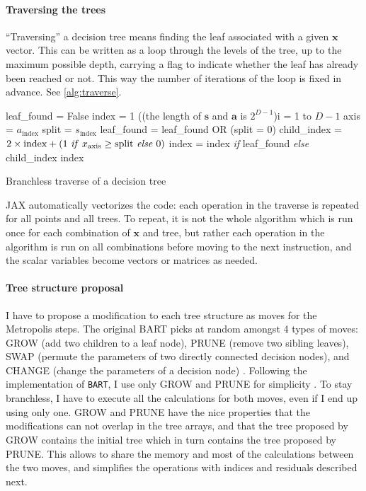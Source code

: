 \documentclass{article}
\begin{document}
    \paragraph{Traversing the trees}

    ``Traversing'' a decision tree means finding the leaf associated with a given $\mathbf x$ vector. This can be written as a loop through the levels of the tree, up to the maximum possible depth, carrying a flag to indicate whether the leaf has already been reached or not. This way the number of iterations of the loop is fixed in advance. See \autoref{alg:traverse}.
    \begin{algorithm}[t]
        leaf\_found = False\;
        index = 1\;
        \For(\hfill (the length of $\mathbf s$ and $\mathbf a$ is $2^{D-1}$\text{)}){i = 1 to $D - 1$}{
            axis = $a_\text{index}$\;
            split = $s_\text{index}$\;
            leaf\_found = leaf\_found OR (split = 0)\;
            child\_index = $2 \times \text{index} + (\text{1 \emph{if} $x_\text{axis} \ge \text{split}$ \emph{else} 0})$\;
            index = index \emph{if} leaf\_found \emph{else} child\_index\; 
        }
        \Return index
        \caption{\label{alg:traverse} Branchless traverse of a decision tree}
    \end{algorithm}
    JAX automatically vectorizes the code: each operation in the traverse is repeated for all points and all trees. To repeat, it is not the whole algorithm which is run once for each combination of $\mathbf x$ and tree, but rather each operation in the algorithm is run on all combinations before moving to the next instruction, and the scalar variables become vectors or matrices as needed.

    \paragraph{Tree structure proposal}

    I have to propose a modification to each tree structure as moves for the Metropolis steps. The original BART picks at random amongst 4 types of moves: GROW (add two children to a leaf node), PRUNE (remove two sibling leaves), SWAP (permute the parameters of two directly connected decision nodes), and CHANGE (change the parameters of a decision node) \autocite[\S5.1, p.~940]{chipman1998}. Following the implementation of \texttt{BART}, I use only GROW and PRUNE for simplicity \autocite[\S C, p.~57]{sparapani2021}. To stay branchless, I have to execute all the calculations for both moves, even if I end up using only one. GROW and PRUNE have the nice properties that the modifications can not overlap in the tree arrays, and that the tree proposed by GROW contains the initial tree which in turn contains the tree proposed by PRUNE. This allows to share the memory and most of the calculations between the two moves, and simplifies the operations with indices and residuals described next.
\end{document}
